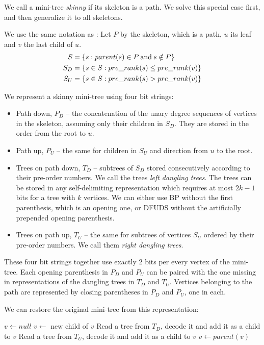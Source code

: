 We call a mini-tree \emph{skinny} if its skeleton is a path.
We solve this special case first, and then generalize it to all skeletons.

We use the same notation as :
Let $P$ by the skeleton, which is a path, $u$ its leaf and $v$ the last child of $u$.
\begin{align*}
	S &= \{ s : parent(s) \in P \mathbin{\textrm{and}} s \notin P \} \\
	S_D &= \{ s \in S : pre\_rank(s) \le pre\_rank(v) \} \\
	S_U &= \{ s \in S : pre\_rank(s) > pre\_rank(v) \}
\end{align*}

We represent a skinny mini-tree using four bit strings:
\begin{itemize}
	\item Path down, $P_D$ -- the concatenation of the unary degree sequences of vertices in the skeleton, assuming only their children in $S_D$.
	They are stored in the order from the root to $u$.
	\item Path up, $P_U$ -- the same for children in $S_U$ and direction from $u$ to the root.
	\item Trees on path down, $T_D$ -- subtrees of $S_D$ stored consecutively according to their pre-order numbers.
	We call the trees \emph{left dangling trees}.
	The trees can be stored in any self-delimiting representation which requires at most $2k - 1$ bits for a tree with $k$ vertices.
	We can either use BP without the first parenthesis, which is an opening one, or DFUDS without the artificially prepended opening parenthesis.
	\item Trees on path up, $T_U$ -- the same for subtrees of vertices $S_U$ ordered by their pre-order numbers.
	We call them \emph{right dangling trees}.
\end{itemize}

These four bit strings together use exactly $2$ bits per every vertex of the mini-tree.
Each opening parenthesis in $P_D$ and $P_U$ can be paired with the one missing in representations of the dangling trees in $T_D$ and $T_U$.
Vertices belonging to the path are represented by closing parentheses in $P_D$ and $P_U$, one in each.

We can restore the original mini-tree from this representation:
\begin{algorithmic}
	\State $v \gets null$
		\State $v \gets$ new child of $v$
			\State Read a tree from $T_D$, decode it and add it as a child to $v$
		\EndWhile
	\EndWhile
			\State Read a tree from $T_U$, decode it and add it as a child to $v$
		\EndWhile
		\State $v \gets parent(v)$
	\EndWhile
\EndFunction
\end{algorithmic}

